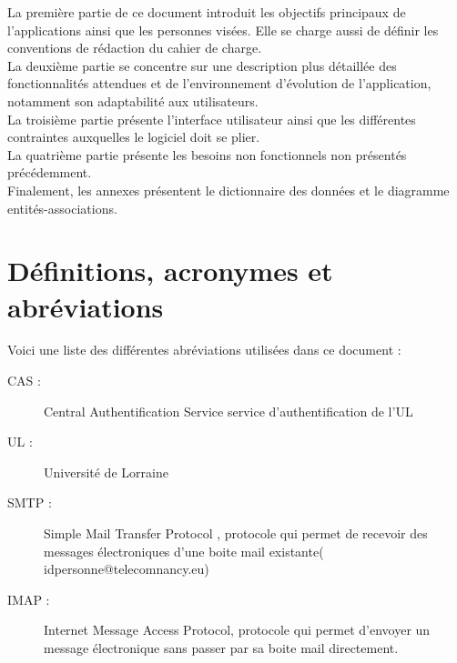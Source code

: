 \documentclass{scrreprt}
\begin{document}
\hspace{0.6cm}La première partie de ce document introduit les objectifs principaux de l'applications ainsi que les personnes visées. Elle se charge aussi de définir les conventions de rédaction du cahier de charge.\\

\hspace{0.6cm}La deuxième partie se concentre sur une description plus détaillée des fonctionnalités attendues et de l'environnement d'évolution de l'application, notamment son adaptabilité aux utilisateurs.\\

\hspace{0.6cm}La troisième partie présente l'interface utilisateur ainsi que les différentes contraintes auxquelles le logiciel doit se plier.\\

\hspace{0.6cm}La quatrième partie présente les besoins non fonctionnels non présentés précédemment.\\

\hspace{0.6cm}Finalement, les annexes présentent le dictionnaire des données et le diagramme entités-associations.

\section{Définitions, acronymes et abréviations}
\hspace{1cm}Voici une liste des différentes abréviations utilisées dans ce document :
\begin{description}
\item[CAS :] Central Authentification Service service d'authentification de l'UL
\item[UL :] Université de Lorraine
\item[SMTP :] Simple Mail Transfer Protocol , protocole qui permet de recevoir des messages électroniques d'une boite mail existante( idpersonne@telecomnancy.eu)
\item[IMAP :] Internet Message Access Protocol, protocole qui permet d'envoyer un message électronique sans passer par sa boite mail directement.


\end{description}
\end{document}
